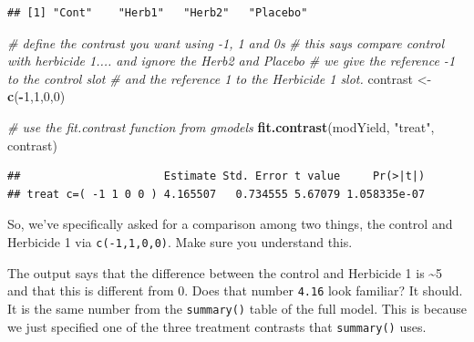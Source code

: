 \documentclass[
]{book}
\newenvironment{Shaded}{\begin{snugshade}}{\end{snugshade}}
\newcommand{\CommentTok}[1]{\textcolor[rgb]{0.56,0.35,0.01}{\textit{#1}}}
\newcommand{\DecValTok}[1]{\textcolor[rgb]{0.00,0.00,0.81}{#1}}
\newcommand{\FunctionTok}[1]{\textcolor[rgb]{0.13,0.29,0.53}{\textbf{#1}}}
\newcommand{\NormalTok}[1]{#1}
\newcommand{\OtherTok}[1]{\textcolor[rgb]{0.56,0.35,0.01}{#1}}
\newcommand{\SpecialCharTok}[1]{\textcolor[rgb]{0.81,0.36,0.00}{\textbf{#1}}}
\newcommand{\StringTok}[1]{\textcolor[rgb]{0.31,0.60,0.02}{#1}}
\begin{document}
\begin{Shaded}
\end{Shaded}

\begin{verbatim}
## [1] "Cont"    "Herb1"   "Herb2"   "Placebo"
\end{verbatim}

\begin{Shaded}
\begin{Highlighting}[]
\CommentTok{\# define the contrast you want using {-}1, 1 and 0\textquotesingle{}s}
\CommentTok{\# this says compare control with herbicide 1.... and ignore the Herb2 and Placebo}
\CommentTok{\# we give the reference {-}1 to the control slot}
\CommentTok{\# and the reference 1 to the Herbicide 1 slot.}
\NormalTok{contrast }\OtherTok{\textless{}{-}} \FunctionTok{c}\NormalTok{(}\SpecialCharTok{{-}}\DecValTok{1}\NormalTok{,}\DecValTok{1}\NormalTok{,}\DecValTok{0}\NormalTok{,}\DecValTok{0}\NormalTok{)}

\CommentTok{\# use the fit.contrast function from gmodels}
\FunctionTok{fit.contrast}\NormalTok{(modYield, }\StringTok{"treat"}\NormalTok{, contrast)}
\end{Highlighting}
\end{Shaded}

\begin{verbatim}
##                      Estimate Std. Error t value     Pr(>|t|)
## treat c=( -1 1 0 0 ) 4.165507   0.734555 5.67079 1.058335e-07
\end{verbatim}

So, we've specifically asked for a comparison among two things, the control and Herbicide 1 via \texttt{c(-1,1,0,0)}. Make sure you understand this.

The output says that the difference between the control and Herbicide 1 is \textasciitilde5 and that this is different from 0. Does that number \texttt{4.16} look familiar? It should. It is the same number from the \texttt{summary()} table of the full model. This is because we just specified one of the three treatment contrasts that \texttt{summary()} uses.
\end{document}

